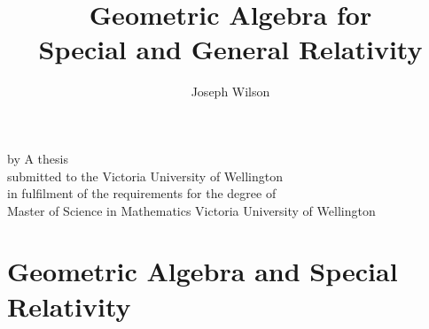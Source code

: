 \newif\ifdebug
\newif\iffinal


% 

\setlength{\parskip}{1em}

\title{Geometric Algebra for \\ Special and General Relativity}
\author{Joseph Wilson}

\makeatletter
\renewcommand\maketitle{
	\begin{center}
		\null\vfill
		{\huge\bfseries\sffamily \@title}
		\vfill
		by
		\vfill
		\@author
		\vfill
		A thesis \\
		submitted to the Victoria University of Wellington \\
		in fulfilment of the requirements for the degree of \\
		Master of Science in Mathematics
		\vfill
		Victoria University of Wellington \\
		\@date
		\vfill
	\end{center}
}
\makeatother




\frontmatter
{} %

	\maketitle
	\thispagestyle{empty}

	
	
	\tableofcontents

\restoregeometry %

\ifdebug
	
\fi

\mainmatter


\part{Geometric Algebra and Special Relativity}
\label{part:1}











